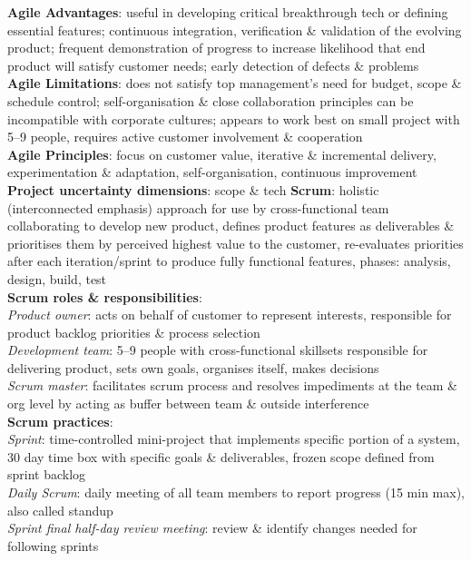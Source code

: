 \documentclass[a4paper]{article}
\begin{document}
\begin{multicols}{2}
        \textbf{Agile Advantages}: useful in developing critical breakthrough tech or defining essential features; continuous integration, verification \& validation of the evolving product; frequent demonstration of progress to increase likelihood that end product will satisfy customer needs; early detection of defects \& problems\\
        \textbf{Agile Limitations}: does not satisfy top management's need for budget, scope \& schedule control; self-organisation \& close collaboration principles can be incompatible with corporate cultures; appears to work best on small project with 5--9 people, requires active customer involvement \& cooperation\\
        \textbf{Agile Principles}: focus on customer value, iterative \& incremental delivery, experimentation \& adaptation, self-organisation, continuous improvement\\
        \textbf{Project uncertainty dimensions}: scope \& tech
        \textbf{Scrum}: holistic (interconnected emphasis) approach for use by cross-functional team collaborating to develop new product, defines product features as deliverables \& prioritises them by perceived highest value to the customer, re-evaluates priorities after each iteration/sprint to produce fully functional features, phases: analysis, design, build, test\\
        \textbf{Scrum roles \& responsibilities}:\\
        \textit{Product owner}: acts on behalf of customer to represent interests, responsible for product backlog priorities \& process selection\\
        \textit{Development team}: 5--9 people with cross-functional skillsets responsible for delivering product, sets own goals, organises itself, makes decisions\\
        \textit{Scrum master}: facilitates scrum process and resolves impediments at the team \& org level by acting as buffer between team \& outside interference\\
        \textbf{Scrum practices}:\\
        \textit{Sprint}: time-controlled mini-project that implements specific portion of a system, 30 day time box with specific goals \& deliverables, frozen scope defined from sprint backlog\\
        \textit{Daily Scrum}: daily meeting of all team members to report progress (15 min max), also called standup\\
        \textit{Sprint final half-day review meeting}: review \& identify changes needed for following sprints\\

\end{multicols}
\end{document}
